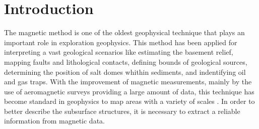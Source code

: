 \section{Introduction}


The magnetic method is one of the oldest geophysical technique that plays an important role in exploration geophysics. This method has been applied for interpreting a vast geological scenarios like estimating the basement relief, mapping faults and lithological contacts, defining bounds of geological sources, determining the position of salt domes whithin sediments, and indentifying oil and gas traps. With the improvement of magnetic measurements, mainly by the use of aeromagnetic surveys providing a large amount of data, this technique has become standard in geophysics to map areas with a variety of scales \citep{blakely1996,nabighian_etal_2005}. In order to better describe the subsurface structures, it is necessary to extract a reliable information from magnetic data. 

